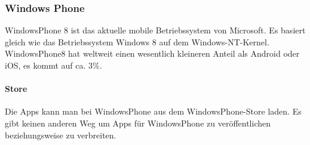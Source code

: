 \subsubsection{Windows Phone}

WindowsPhone 8 ist das aktuelle mobile Betriebssystem von Microsoft. Es basiert gleich wie das Betriebssystem Windows 8 auf dem Windows-NT-Kernel. WindowsPhone8 hat weltweit einen wesentlich kleineren Anteil als Android oder iOS, es kommt auf ca. 3\%.\\
\paragraph{Store\\}
Die Apps kann man bei WindowsPhone aus dem WindowsPhone-Store laden. Es gibt keinen anderen Weg um Apps für WindowsPhone zu veröffentlichen beziehungsweise zu verbreiten.\\
